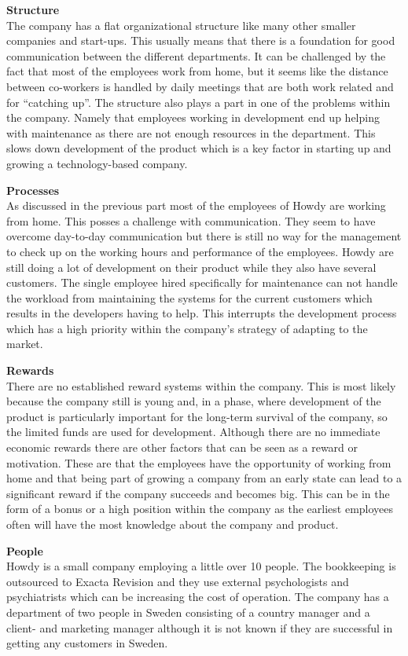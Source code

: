 \noindent \textbf{Structure}\\
\noindent The company has a flat organizational structure like many other smaller companies and start-ups. This usually means that there is a foundation for good communication between the different departments. It can be challenged by the fact that most of the employees work from home, but it seems like the distance between co-workers is handled by daily meetings that are both work related and for “catching up”. The structure also plays a part in one of the problems within the company. Namely that employees working in development end up helping with maintenance as there are not enough resources in the department. This slows down development of the product which is a key factor in starting up and growing a technology-based company.

\noindent \textbf{Processes}\\
\noindent As discussed in the previous part most of the employees of Howdy are working from home. This posses a challenge with communication. They seem to have overcome day-to-day communication but there is still no way for the management to check up on the working hours and performance of the employees.
Howdy are still doing a lot of development on their product while they also have several customers. The single employee hired specifically for maintenance can not handle the workload from maintaining the systems for the current customers which results in the developers having to help. This interrupts the development process which has a high priority within the company’s strategy of adapting to the market.

\noindent \textbf{Rewards}\\
\noindent There are no established reward systems within the company. This is most likely because the company still is young and, in a phase, where development of the product is particularly important for the long-term survival of the company, so the limited funds are used for development. Although there are no immediate economic rewards there are other factors that can be seen as a reward or motivation. These are that the employees have the opportunity of working from home and that being part of growing a company from an early state can lead to a significant reward if the company succeeds and becomes big. This can be in the form of a bonus or a high position within the company as the earliest employees often will have the most knowledge about the company and product.

\noindent \textbf{People}\\
\noindent Howdy is a small company employing a little over 10 people. The bookkeeping is outsourced to Exacta Revision and they use external psychologists and psychiatrists which can be increasing the cost of operation.
The company has a department of two people in Sweden consisting of a country manager and a client- and marketing manager although it is not known if they are successful in getting any customers in Sweden.


